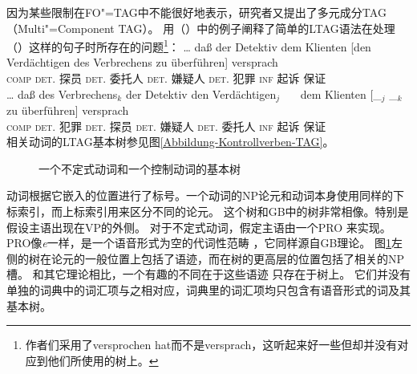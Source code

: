 因为某些限制在FO"=TAG中不能很好地表示\citep[--50]{Rambow94a}，研究者又提出了多元成分TAG（Multi"=Component TAG）。%
 \citet*{JBR2000a}用（）中的例子阐释了简单的LTAG语法在处理（）这样的句子时所存在的问题\footnote{%
  作者们采用了versprochen hat而不是versprach，这听起来好一些但却并没有对应到他们所使用的树上。
}：
\eal
\ex 
\gll \ldots{} daß  der        Detektiv  dem        Klienten [den Verdächtigen des Verbrechens zu überführen] versprach\\
{}  \textsc{comp}  \textsc{det}.\nom{} 探员 \textsc{det}.\dat{} 委托人   \spacebr{}\textsc{det}.\acc{} 嫌疑人 \textsc{det}.\gen{} 犯罪 \textsc{inf} 起诉 保证\\
\ex\label{Beispiel-Joshi-NP4} 
\gll \ldots{} daß  des        Verbrechens$_k$ der        Detektiv  den Verdächtigen$_j$~~~ dem         Klienten [\_$_j$ \_$_k$ zu überführen] versprach\\
{}     \textsc{comp}  \textsc{det}.\gen{} 犯罪           \textsc{det}.\nom{} 探员 \textsc{det}.\acc{} 嫌疑人   \textsc{det}.\dat{}  委托人   {}      {}     \textsc{inf} 起诉  保证\\
\zl
相关动词的LTAG基本树参见图\vref{Abbildung-Kontrollverben-TAG}。
\begin{figure}
\oneline{%
\begin{forest}
tag, baseline
[S
	[NP$_2^2\downarrow$]
	[S
		[NP$_2^1\downarrow$]
		[S
			[NP
				[PRO]]
			[VP
				[NP$_2^1$
					[e]]
				[NP$_2^2$
					[e]]
				[V$_2$
					[zu überführen;\textsc{inf} 起诉]]]]]]
\end{forest}
\begin{forest}
tag, baseline
[S
	[NP$_1^1\downarrow$]
	[VP
		[NP$_1^2\downarrow$]
		[S*]
		[V$_1$
		[versprach;保证]]]]
\end{forest}
}
\caption{\label{Abbildung-Kontrollverben-TAG}一个不定式动词和一个控制动词的基本树} 
\end{figure}%
动词根据它嵌入的位置进行了标号。一个动词的NP论元和动词本身使用同样的下标索引，而上标索引用来区分不同的论元。
这个树和GB\indexgbc 中的树非常相像。特别是假设主语出现在VP的外侧。
对于不定式动词，假定主语由一个PRO
来实现。PRO像\emph{e}一样，是一个语音形式为空的代词性范畴
，它同样源自GB理论。
图\ref{Abbildung-Kontrollverben-TAG}左侧的树在论元的一般位置上包括了语迹，而在树的更高层的位置包括了相关的NP槽。
和其它理论相比，一个有趣的不同在于这些语迹
只存在于树上。
它们并没有单独的词典中的词汇项与之相对应，词典里的词汇项均只包含有语音形式的词及其基本树。

